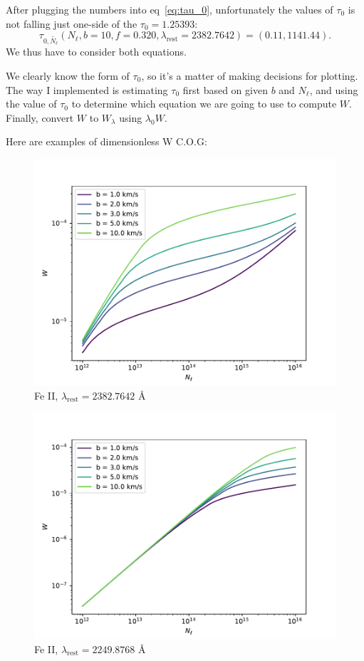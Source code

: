 \documentclass[12pt,letterpaper]{article}
\newcommand{\lambdarest}{\lambda_{\textrm{rest}}}
\newcommand{\columndensity}{N_\ell}
\newcommand{\columndensityrv}{\tilde{\columndensity}}
\begin{document}
After plugging the numbers into eq~\ref{eq:tau_0}, unfortunately the values of $\tau_0$ is not falling just one-side of the $\tau_0 = 1.25393$:
\begin{equation*}
    \tau_{0,\columndensityrv}(\columndensity, b=10, f=0.320, \lambdarest=2382.7642)
    = (0.11, 1141.44).
\end{equation*}
We thus have to consider both equations.

We clearly know the form of $\tau_0$, so it's a matter of making decisions for plotting.
The way I implemented is estimating $\tau_0$ first based on given $b$ and $\columndensity$, and using the value of $\tau_0$ to determine which equation we are going to use to compute $W$. 
Finally, convert $W$ to $W_{\lambda}$ using $\lambda_0 W$.

Here are examples of dimensionless W C.O.G:
\begin{figure}[H]
    \centering
    \includegraphics[width=0.75\columnwidth]{images/W_N_Fe_II_1.pdf}
    \caption{Fe II, $\lambdarest = 2382.7642$ \AA}
\end{figure}
\begin{figure}[H]
    \centering
    \includegraphics[width=0.75\columnwidth]{images/W_N_Fe_II_2.pdf}
    \caption{Fe II, $\lambdarest = 2249.8768$ \AA}
\end{figure}
\end{document}
